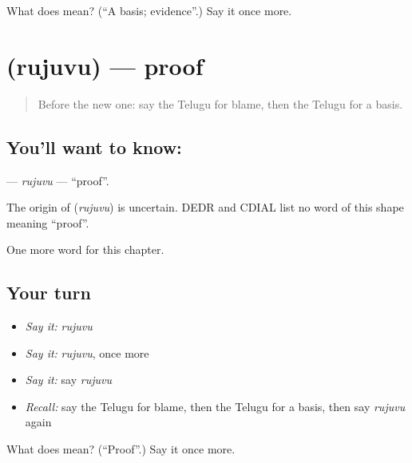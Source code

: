\begin{tcolorbox}[breakable,colback=teal!4,colframe=teal!35!black,title={Before you move on}]
What does  mean? (\textquotedblleft{}A basis; evidence\textquotedblright{}.) Say it once more.
\end{tcolorbox}
\section[\texorpdfstring{\te{రుజువు} (rujuvu)}{రుజువు (rujuvu)}]{ (rujuvu) — proof}

\label{lesson:TE-C219-rujuvu}



\begin{quote}
Before the new one: say the Telugu for blame, then the Telugu for a basis.
\end{quote}

\subsection*{You'll want to know: }
\textbf{} — \emph{rujuvu} — \textquotedblleft{}proof\textquotedblright{}.

\begin{cousinweb}
The origin of \textbf{} (\emph{rujuvu}) is uncertain. DEDR and CDIAL list no word of this shape meaning \textquotedblleft{}proof\textquotedblright{}.
\end{cousinweb}

\begin{grammarlens}[title={What you've built}]
One more word for this chapter.
\end{grammarlens}

\subsection*{Your turn}
\begin{itemize}
\raggedright
  \item \emph{Say it:} \emph{rujuvu}
  \item \emph{Say it:} \emph{rujuvu}, once more
  \item \emph{Say it:} say \emph{rujuvu}
  \item \emph{Recall:} say the Telugu for blame, then the Telugu for a basis, then say \emph{rujuvu} again
\end{itemize}

\begin{tcolorbox}[breakable,colback=teal!4,colframe=teal!35!black,title={Before you move on}]
What does  mean? (\textquotedblleft{}Proof\textquotedblright{}.) Say it once more.
\end{tcolorbox}
